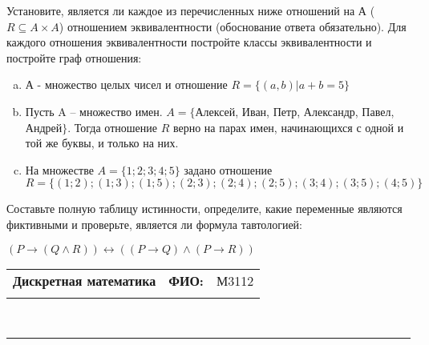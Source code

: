 \documentclass[10pt]{exam}
\newcommand{\class}{Дискретная математика}
\newcommand{\examdate}{}
\begin{document}
\begin{questions}
\question
Установите, является ли каждое из перечисленных ниже отношений на А ($R \subseteq A \times A$) отношением эквивалентности (обоснование ответа обязательно). Для каждого отношения эквивалентности постройте классы 
эквивалентности и постройте граф отношения:
\begin{enumerate} [a)]\setcounter{enumi}{0}
\item А - множество целых чисел и отношение $R = \{(a,b)|a + b = 5\}$
\item Пусть A – множество имен. $A = \{ $Алексей, Иван, Петр, Александр, Павел, Андрей$ \}$. Тогда отношение $R $ верно на парах имен, начинающихся с одной и той же буквы, и только на них.
\item На множестве $A = \{1; 2; 3; 4; 5\}$ задано отношение $R = \{(1; 2); (1; 3); (1; 5); (2; 3); (2; 4); (2; 5); (3; 4); (3; 5); (4; 5)\}$
\end{enumerate}\question Составьте полную таблицу истинности, определите, какие переменные являются фиктивными и проверьте, является ли формула тавтологией:

$(P \rightarrow (Q \land R)) \leftrightarrow ((P \rightarrow Q) \land (P \rightarrow R))$

\end{questions}
\newpage
\begin{flushright}
\begin{tabular}{p{2.8in} r l}
\textbf{\class} & \textbf{ФИО:} &М3112
\\

\textbf{\examdate} &&\\
\end{tabular}\\
\end{flushright}
\rule[1ex]{\textwidth}{.1pt}
\end{document}
